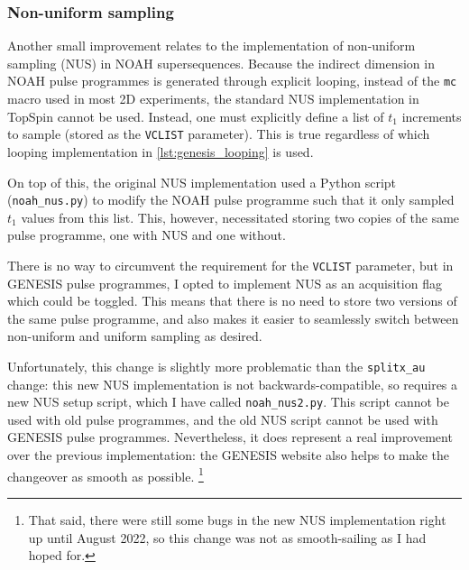 \subsubsection{Non-uniform sampling}

Another small improvement relates to the implementation of non-uniform sampling (NUS) in NOAH supersequences.
Because the indirect dimension in NOAH pulse programmes is generated through explicit looping, instead of the \texttt{mc} macro used in most 2D experiments, the standard NUS implementation in TopSpin cannot be used.
Instead, one must explicitly define a list of $t_1$ increments to sample (stored as the \texttt{VCLIST} parameter).
This is true regardless of which looping implementation in \cref{lst:genesis_looping} is used.

On top of this, the original NUS implementation\autocite{Claridge2019MRC} used a Python script (\texttt{noah\_nus.py}) to modify the NOAH pulse programme such that it only sampled $t_1$ values from this list.
This, however, necessitated storing two copies of the same pulse programme, one with NUS and one without.

There is no way to circumvent the requirement for the \texttt{VCLIST} parameter, but in GENESIS pulse programmes, I opted to implement NUS as an acquisition flag which could be toggled.
This means that there is no need to store two versions of the same pulse programme, and also makes it easier to seamlessly switch between non-uniform and uniform sampling as desired.

Unfortunately, this change is slightly more problematic than the \texttt{splitx\_au} change: this new NUS implementation is not backwards-compatible, so requires a new NUS setup script, which I have called \texttt{noah\_nus2.py}.
This script cannot be used with old pulse programmes, and the old NUS script cannot be used with GENESIS pulse programmes.
Nevertheless, it does represent a real improvement over the previous implementation: the GENESIS website also helps to make the changeover as smooth as possible.%
\footnote{That said, there were still some bugs in the new NUS implementation right up until August 2022, so this change was not as smooth-sailing as I had hoped for.}
